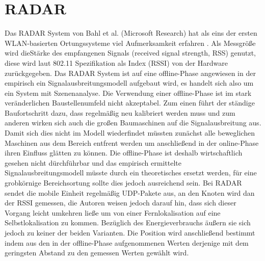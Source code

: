 \section{RADAR}
\label{ch:Vorherige:sec:RADAR}
Das RADAR System von Bahl et al. (Microsoft Research) hat als eins der ersten WLAN-basierten Ortungssysteme viel Aufmerksamkeit erfahren \cite{bahl2000radar}.
Als Messgröße wird dieStärke des empfangenen Signals (received signal strength, RSS) genutzt, diese wird laut 802.11 Spezifikation als Index (RSSI) von der Hardware zurückgegeben. 
Das RADAR System ist auf eine offline-Phase angewiesen in der empirisch ein Signalausbreitungsmodell aufgebaut wird, es handelt sich also um ein System mit Szenenanalyse.
Die Verwendung einer offline-Phase ist im stark veränderlichen Baustellenumfeld nicht akzeptabel. 
Zum einen führt der ständige Baufortschritt dazu, dass regelmäßig neu kalibriert werden muss und zum anderen wirken sich auch die großen Baumaschinen auf die Signalausbreitung aus. 
Damit sich dies nicht im Modell wiederfindet müssten zunächst alle beweglichen Maschinen aus dem Bereich entfrent werden um anschließend in der online-Phase ihren Einfluss glätten zu können.
Die offline-Phase ist deshalb wirtschaftlich gesehen nicht dürchführbar und das empirisch ermittelte Signalausbreitungsmodell müsste durch ein theoretisches ersetzt werden, für eine grobkörnige Bereichsortung sollte dies jedoch ausreichend sein.
Bei RADAR sendet die mobile Einheit regelmäßig UDP-Pakete aus, an den Knoten wird dan der RSSI gemessen, die Autoren weisen jedoch darauf hin, dass sich dieser Vorgang leicht umkehren ließe um von einer Fernlokalisation auf eine Selbstlokalisation zu kommen.
Bezüglich des Energieverbrauchs äußern sie sich jedoch zu keiner der beiden Varianten.
Die Position wird anschließend bestimmt indem aus den in der offline-Phase aufgenommenen Werten derjenige mit dem geringsten Abstand zu den gemessen Werten gewählt wird.
